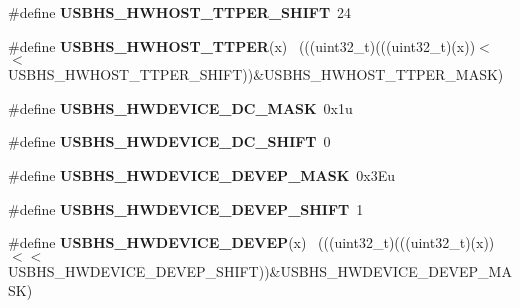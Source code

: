 \begin{DoxyCompactItemize}
\item 
\hypertarget{group___u_s_b_h_s___register___masks_ga65db197ae82d34447fae031eb4f91e23}{}\#define {\bfseries U\+S\+B\+H\+S\+\_\+\+H\+W\+H\+O\+S\+T\+\_\+\+T\+T\+P\+E\+R\+\_\+\+S\+H\+I\+F\+T}~24\label{group___u_s_b_h_s___register___masks_ga65db197ae82d34447fae031eb4f91e23}

\item 
\hypertarget{group___u_s_b_h_s___register___masks_ga0507e33f84c9ebd07d3dc2377a52d0e2}{}\#define {\bfseries U\+S\+B\+H\+S\+\_\+\+H\+W\+H\+O\+S\+T\+\_\+\+T\+T\+P\+E\+R}(x)                                    ~(((uint32\+\_\+t)(((uint32\+\_\+t)(x))$<$$<$U\+S\+B\+H\+S\+\_\+\+H\+W\+H\+O\+S\+T\+\_\+\+T\+T\+P\+E\+R\+\_\+\+S\+H\+I\+F\+T))\&U\+S\+B\+H\+S\+\_\+\+H\+W\+H\+O\+S\+T\+\_\+\+T\+T\+P\+E\+R\+\_\+\+M\+A\+S\+K)\label{group___u_s_b_h_s___register___masks_ga0507e33f84c9ebd07d3dc2377a52d0e2}

\item 
\hypertarget{group___u_s_b_h_s___register___masks_gacb2205fd1162007b6fb7d4d76555ffad}{}\#define {\bfseries U\+S\+B\+H\+S\+\_\+\+H\+W\+D\+E\+V\+I\+C\+E\+\_\+\+D\+C\+\_\+\+M\+A\+S\+K}~0x1u\label{group___u_s_b_h_s___register___masks_gacb2205fd1162007b6fb7d4d76555ffad}

\item 
\hypertarget{group___u_s_b_h_s___register___masks_ga1319a1938bd4215b3782aeb9b0d4deda}{}\#define {\bfseries U\+S\+B\+H\+S\+\_\+\+H\+W\+D\+E\+V\+I\+C\+E\+\_\+\+D\+C\+\_\+\+S\+H\+I\+F\+T}~0\label{group___u_s_b_h_s___register___masks_ga1319a1938bd4215b3782aeb9b0d4deda}

\item 
\hypertarget{group___u_s_b_h_s___register___masks_ga24d90318ff66fa7e6a6b70b430553822}{}\#define {\bfseries U\+S\+B\+H\+S\+\_\+\+H\+W\+D\+E\+V\+I\+C\+E\+\_\+\+D\+E\+V\+E\+P\+\_\+\+M\+A\+S\+K}~0x3\+Eu\label{group___u_s_b_h_s___register___masks_ga24d90318ff66fa7e6a6b70b430553822}

\item 
\hypertarget{group___u_s_b_h_s___register___masks_ga050227ffef4b703d939d165a1eea1bdf}{}\#define {\bfseries U\+S\+B\+H\+S\+\_\+\+H\+W\+D\+E\+V\+I\+C\+E\+\_\+\+D\+E\+V\+E\+P\+\_\+\+S\+H\+I\+F\+T}~1\label{group___u_s_b_h_s___register___masks_ga050227ffef4b703d939d165a1eea1bdf}

\item 
\hypertarget{group___u_s_b_h_s___register___masks_ga23580e60039744fee788cbbe56980b0c}{}\#define {\bfseries U\+S\+B\+H\+S\+\_\+\+H\+W\+D\+E\+V\+I\+C\+E\+\_\+\+D\+E\+V\+E\+P}(x)                                ~(((uint32\+\_\+t)(((uint32\+\_\+t)(x))$<$$<$U\+S\+B\+H\+S\+\_\+\+H\+W\+D\+E\+V\+I\+C\+E\+\_\+\+D\+E\+V\+E\+P\+\_\+\+S\+H\+I\+F\+T))\&U\+S\+B\+H\+S\+\_\+\+H\+W\+D\+E\+V\+I\+C\+E\+\_\+\+D\+E\+V\+E\+P\+\_\+\+M\+A\+S\+K)\label{group___u_s_b_h_s___register___masks_ga23580e60039744fee788cbbe56980b0c}


\end{DoxyCompactItemize}
